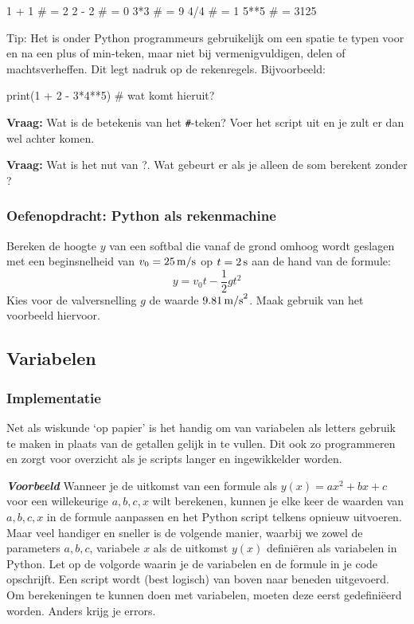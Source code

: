 \documentclass[a4paper,11pt, fleqn]{article}
\begin{document}
\begin{python}
1 + 1 # = 2
2 - 2 # = 0
3*3   # = 9
4/4   # = 1
5**5  # = 3125
\end{python}

Tip: Het is onder Python programmeurs gebruikelijk om een spatie te typen voor en na een plus of min-teken, maar niet bij vermenigvuldigen, delen of machtsverheffen. Dit legt nadruk op de rekenregels. Bijvoorbeeld: 

\begin{python}
print(1 + 2 - 3*4**5) # wat komt hieruit?
\end{python}
\textbf{Vraag:} Wat is de betekenis van het \verb,#,-teken? Voer het script uit en je zult er dan wel achter komen. 

\textbf{Vraag:} Wat is het nut van ?. Wat gebeurt er als je alleen de som berekent zonder ?
\subsubsection*{Oefenopdracht: Python als rekenmachine} Bereken de hoogte $y$ van een softbal die vanaf de grond omhoog wordt geslagen met een beginsnelheid van $v_0 = 25 \, {\rm m/s}$ op $t = 2 \, {\rm s}$ aan de hand van de formule:
\begin{equation}
y = v_0 t - \frac{1}{2}g t^2
\label{eq-ball}
\end{equation}
Kies voor de valversnelling $g$ de waarde $9.81 \, {\rm m/s}^2$. Maak gebruik van het voorbeeld hiervoor.

\subsection{Variabelen}
\label{sec-vars}

\subsubsection{Implementatie}
Net als wiskunde `op papier' is het handig om van variabelen als letters gebruik te maken in plaats van de getallen gelijk in te vullen. Dit ook zo programmeren en zorgt voor overzicht als je scripts langer en ingewikkelder worden.

\textit{\textbf{Voorbeeld}} Wanneer je de uitkomst van een formule als $y(x) = ax^2+bx+c$ voor een willekeurige $a, b, c, x$ wilt berekenen, kunnen je elke keer de waarden van $a, b, c, x$ in de formule aanpassen en het Python script telkens opnieuw uitvoeren. Maar veel handiger en sneller is de volgende manier, waarbij we zowel de parameters $a,b,c$, variabele $x$ als de uitkomst $y(x)$ defini\"eren als variabelen in Python. Let op de volgorde waarin je de variabelen en de formule in je code opschrijft. Een script wordt (best logisch) van boven naar beneden uitgevoerd. Om berekeningen te kunnen doen met variabelen, moeten deze eerst gedefini\"eerd worden. Anders krijg je errors.
\end{document}
